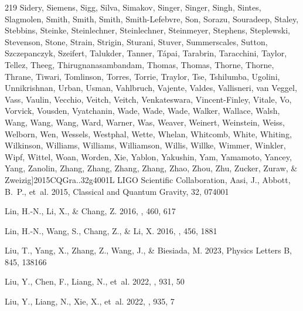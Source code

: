 \documentclass{aa}
\begin{document}
\begin{thebibliography}{219}
{		{Sidery}, {Siemens}, {Sigg}, {Silva}, {Simakov}, {Singer}, {Singer}, {Singh}, {Sintes}, {Slagmolen}, {Smith}, {Smith}, {Smith}, {Smith-Lefebvre}, {Son}, {Sorazu}, {Souradeep}, {Staley}, {Stebbins}, {Steinke}, {Steinlechner}, {Steinlechner}, {Steinmeyer}, {Stephens}, {Steplewski}, {Stevenson}, {Stone}, {Strain}, {Strigin}, {Sturani}, {Stuver}, {Summerscales}, {Sutton}, {Szczepanczyk}, {Szeifert}, {Talukder}, {Tanner}, {T{\'a}pai}, {Tarabrin}, {Taracchini}, {Taylor}, {Tellez}, {Theeg}, {Thirugnanasambandam}, {Thomas}, {Thomas}, {Thorne}, {Thorne}, {Thrane}, {Tiwari}, {Tomlinson}, {Torres}, {Torrie}, {Traylor}, {Tse}, {Tshilumba}, {Ugolini}, {Unnikrishnan}, {Urban}, {Usman}, {Vahlbruch}, {Vajente}, {Valdes}, {Vallisneri}, {van Veggel}, {Vass}, {Vaulin}, {Vecchio}, {Veitch}, {Veitch}, {Venkateswara}, {Vincent-Finley}, {Vitale}, {Vo}, {Vorvick}, {Vousden}, {Vyatchanin}, {Wade}, {Wade}, {Wade}, {Walker}, {Wallace}, {Walsh}, {Wang}, {Wang}, {Wang}, {Ward}, {Warner}, {Was}, {Weaver}, {Weinert}, {Weinstein},
		{Weiss}, {Welborn}, {Wen}, {Wessels}, {Westphal}, {Wette}, {Whelan}, {Whitcomb}, {White}, {Whiting}, {Wilkinson}, {Williams}, {Williams}, {Williamson}, {Willis}, {Willke}, {Wimmer}, {Winkler}, {Wipf}, {Wittel}, {Woan}, {Worden}, {Xie}, {Yablon}, {Yakushin}, {Yam}, {Yamamoto}, {Yancey}, {Yang}, {Zanolin}, {Zhang}, {Zhang}, {Zhang}, {Zhang}, {Zhao}, {Zhou}, {Zhu}, {Zucker}, {Zuraw}, \& {Zweizig}}]{2015CQGra..32g4001L}
	{LIGO Scientific Collaboration}, {Aasi}, J., {Abbott}, B.~P., {et~al.} 2015, Classical and Quantum Gravity, 32, 074001
	
	{Lin}, H.-N., {Li}, X., \& {Chang}, Z. 2016{}, \mnras, 460, 617
	
	{Lin}, H.-N., {Wang}, S., {Chang}, Z., \& {Li}, X. 2016{}, \mnras, 456, 1881
	
	{Liu}, T., {Yang}, X., {Zhang}, Z., {Wang}, J., \& {Biesiada}, M. 2023{}, Physics Letters B, 845, 138166
	
	{Liu}, Y., {Chen}, F., {Liang}, N., {et~al.} 2022{}, \apj, 931, 50
	
	{Liu}, Y., {Liang}, N., {Xie}, X., {et~al.} 2022{}, \apj, 935, 7
	

\end{thebibliography}
\end{document}
